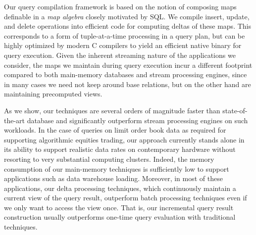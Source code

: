 \medskip







Our query compilation framework is based on the notion of composing maps
definable in a {\em map algebra}\/ closely motivated by SQL.
We compile insert, update, and delete operations into efficient code for computing
deltas of these maps. This corresponds to a form of
tuple-at-a-time processing in a query plan, but can be highly optimized by
modern C compilers to yield an efficient native binary for query execution.
Given the inherent streaming nature of the applications we consider, the maps we
maintain during query execution incur a different footprint compared to both
main-memory databases and stream processing engines, since in many cases we need
not keep around base relations, but on the other hand are maintaining precomputed
views.



As we  show, our techniques are several orders of  magnitude   faster  than
state-of-the-art   database  and significantly outperform stream processing
engines on such workloads.  In the case of queries on limit order  book  data  as
 required for  supporting  algorithmic  equities trading, our approach currently
stands alone in its ability to support realistic  data rates  on contemporary
hardware without  resorting to very substantial computing clusters. Indeed, the
memory consumption of our main-memory techniques is sufficiently low to support
applications such as data warehouse loading. Moreover, in most of these
applications, our delta processing techniques, which continuously maintain a
current view of the query result, outperform batch processing techniques even if
we only want to access the view once. That is, our incremental query result
construction usually outperforms one-time query evaluation with traditional
techniques.


